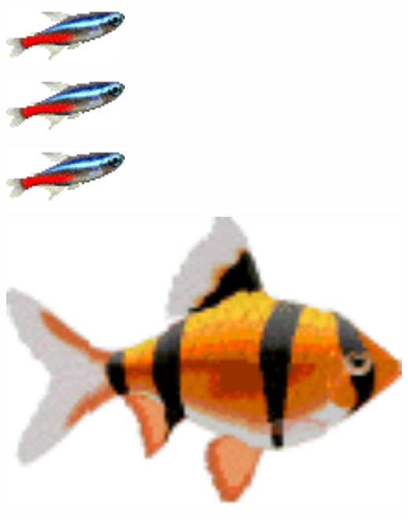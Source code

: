 \begin{minipage}{0.3\textwidth}
\hfill\includegraphics[width=0.3\textwidth]{./inf/SEKII/18_Java_Arrays/Aufgabe5b.png}\hfill{}

\vspace{1cm}

\includegraphics[width=0.3\textwidth]{./inf/SEKII/18_Java_Arrays/Aufgabe5b.png}\hfill

\vspace{1cm}

\hfill\includegraphics[width=0.3\textwidth]{./inf/SEKII/18_Java_Arrays/Aufgabe5b.png}
\end{minipage}
\hfill
\begin{minipage}{0.2\textwidth}
\includegraphics[width=1.0\textwidth]{./inf/SEKII/18_Java_Arrays/Aufgabe5c.png}
\end{minipage}
\hfill
